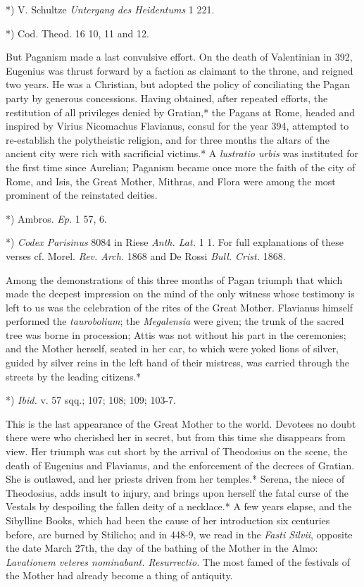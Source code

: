 \documentclass[a4paper, 11pt, oneside, polutonikogreek, english]{article}
\begin{document}
*) V. Schultze \emph{Untergang des Heidentums} 1 221.

*) Cod. Theod. 16 10, 11 and 12.

But Paganism made a last convulsive effort. On the death of Valentinian in 392, Eugenius was thrust forward by a faction as claimant to the throne, and reigned two years. He was a Christian, but adopted the policy of conciliating the Pagan party by generous concessions. Having obtained, after repeated efforts, the restitution of all privileges denied by Gratian,* the Pagans at Rome, headed and inspired by Virius Nicomachus Flavianus, consul for the year 394, attempted to re-establish the polytheistic religion, and for three months the altars of the ancient city were rich with sacrificial victims.* A \emph{lustratio urbis} was instituted for the first time since Aurelian; Paganism became once more the faith of the city of Rome, and Isis, the Great Mother, Mithras, and Flora were among the most prominent of the reinstated deities.

*) Ambros. \emph{Ep.} 1 57, 6.

*) \emph{Codex Parisinus} 8084 in Riese \emph{Anth. Lat.} 1 1. For full explanations of these verses cf. Morel. \emph{Rev. Arch.} 1868 and De Rossi \emph{Bull. Crist.} 1868.

Among the demonstrations of this three months of Pagan triumph that which made the deepest impression on the mind of the only witness whose testimony is left to us was the celebration of the rites of the Great Mother. Flavianus himself performed the \emph{taurobolium}; the \emph{Megalensia} were given; the trunk of the sacred tree was borne in procession; Attis was not without his part in the ceremonies; and the Mother herself, seated in her car, to which were yoked lions of silver, guided by silver reins in the left hand of their mistress, was carried through the streets by the leading citizens.*

*) \emph{Ibid.} v. 57 sqq.; 107; 108; 109; 103-7.

This is the last appearance of the Great Mother to the world. Devotees no doubt there were who cherished her in secret, but from this time she disappears from view. Her triumph was cut short by the arrival of Theodosius on the scene, the death of Eugenius and Flavianus, and the enforcement of the decrees of Gratian. She is outlawed, and her priests driven from her temples.* Serena, the niece of Theodosius, adds insult to injury, and brings upon herself the fatal curse of the Vestals by despoiling the fallen deity of a necklace.* A few years elapse, and the Sibylline Books, which had been the cause of her introduction six centuries before, are burned by Stilicho; and in 448-9, we read in the \emph{Fasti Silvii}, opposite the date March 27th, the day of the bathing of the Mother in the Almo: \emph{Lavationem veteres nominabant. Resurrectio.} The most famed of the festivals of the Mother had already become a thing of antiquity.
\end{document}
